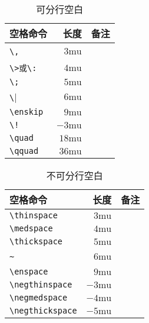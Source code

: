 {\begin{table}[htpb]
	\centering
	\begin{tabular}{lrl} \toprule
		空格命令                  & 长度          & 备注                          \\ \midrule
		\verb|\,|                 & $3\text{mu}$  & \Rightarrow\,\Leftarrow       \\
		\verb|\>或\:|             & $4\text{mu}$  & \Rightarrow\>\Leftarrow       \\
		\verb|\;|                 & $5\text{mu}$  & \Rightarrow\;\Leftarrow       \\
		\verb|\|\textvisiblespace & $6\text{mu}$  & \Rightarrow\ \Leftarrow       \\
		\verb|\enskip|            & $9\text{mu}$  & \Rightarrow\enskip \Leftarrow \\
		\verb|\!|                 & $-3\text{mu}$ & \Rightarrow\!\Leftarrow       \\
		\verb|\quad|              & $18\text{mu}$ & \Rightarrow\quad \Leftarrow   \\
		\verb|\qquad|             & $36\text{mu}$ & \Rightarrow\qquad \Leftarrow  \\ \bottomrule
	\end{tabular}
	\caption{可分行空白}
\end{table}
\pagebreak

\begin{table}[htpb]
	\centering
	\begin{tabular}{lrl} \toprule
		空格命令              & 长度          & 备注                                 \\ \midrule
		\verb|\thinspace|     & $3\text{mu}$  & \Rightarrow\thinspace \Leftarrow     \\
		\verb|\medspace|      & $4\text{mu}$  & \Rightarrow\medspace \Leftarrow      \\
		\verb|\thickspace|    & $5\text{mu}$  & \Rightarrow\thickspace \Leftarrow    \\
		\verb|~|              & $6\text{mu}$  & \Rightarrow~\Leftarrow               \\
		\verb|\enspace|       & $9\text{mu}$  & \Rightarrow\enspace \Leftarrow       \\
		\verb|\negthinspace|  & $-3\text{mu}$ & \Rightarrow\negthinspace \Leftarrow  \\
		\verb|\negmedspace|   & $-4\text{mu}$ & \Rightarrow\negmedspace \Leftarrow   \\
		\verb|\negthickspace| & $-5\text{mu}$ & \Rightarrow\negthickspace \Leftarrow \\
		\bottomrule
	\end{tabular}
	\caption{不可分行空白}
\end{table}

}
